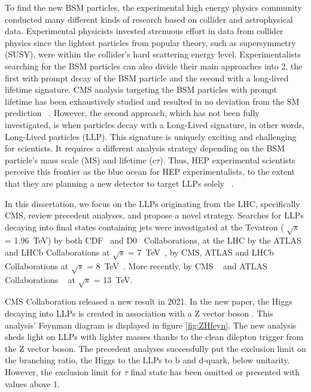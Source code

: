 To find the new BSM particles, the experimental high energy physics community conducted many different kinds of research based on collider and astrophysical data.
Experimental physicists invested strenuous effort in data from collider physics since the lightest particles from popular theory, such as supersymmetry (SUSY), were within the collider's hard scattering energy level.
Experimentalists searching for the BSM particles can also divide their main approaches into 2, the first with prompt decay of the BSM particle and the second with a long-lived lifetime signature.
CMS analysis targeting the BSM particles with prompt lifetime has been exhaustively studied and resulted in no deviation from the SM prediction ~\cite{SUSY}.
However, the second approach, which has not been fully investigated, is when particles decay with a Long-Lived signature, in other words, Long-Lived particles (LLP).
This signature is uniquely exciting and challenging for scientists.
It requires a different analysis strategy depending on the BSM particle's mass scale (MS) and lifetime (c$\tau$).
Thus, HEP experimental scientists perceive this frontier as the blue ocean for HEP experimentalists, to the extent that they are planning a new detector to target LLPs solely ~\cite{Barron:2022aac}.

In this dissertation, we focus on the LLPs originating from the LHC, specifically CMS, review precedent analyses, and propose a novel strategy.
Searches for LLPs decaying into final states containing jets were investigated
at the Tevatron ( $\sqrt{s}$ = 1.96~TeV) by both CDF~\cite{Aaltonen:2011rja} and D0~\cite{Abazov:2009ik} Collaborations,
at the LHC by the ATLAS and LHCb Collaborations at $\sqrt{s}$ = 7~TeV~\cite{ATLAS:2012av,Aaij:2014nma},
by CMS, ATLAS and LHCb Collaborations at $\sqrt{s}$ = 8~TeV~\cite{Aad:2015uaa,Aad:2015rba,PhysRevD.91.012007,Aad:2015asa,Aaij:2017mic,Aaij:2016xmb,Aaij:2015ica}.
More recently, by CMS ~\cite{Sirunyan:2017jdo,displacedvertices,displacedjets2016,delayedjets,emergingjets,CMS-PAS-EXO-19-021}
 and ATLAS Collaborations ~\cite{Aaboud:2018iil,Aaboud:2018jbr,Aaboud:2018arf,Aaboud:2018aqj,Aaboud:2018kbe,Aaboud:2019trc,Aaboud:2019opc,Aad:2019kiz,Aad:2019pfm,Aad:2019tcc,Aad:2019xav,Aad:2019tua} at $\sqrt{s}$ = 13~TeV.

CMS Collaboration released a new result in 2021.
In the new paper, the Higgs decaying into LLPs is created in association with a Z vector boson \cite{ZHAN}.
This analysis' Feynman diagram is displayed in figure \ref{fig:ZHfeyn}.
The new analysis sheds light on LLPs with lighter masses thanks to the clean dilepton trigger from the Z vector boson.
The precedent analyses successfully put the exclusion limit on the branching ratio, the Higgs to the LLPs to b and d-quark, below unitarity. 
However, the exclusion limit for $\tau$ final state has been omitted or presented with values above 1.

